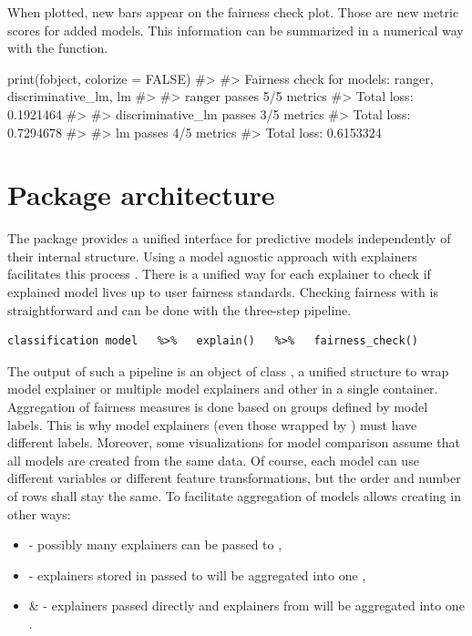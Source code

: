 When plotted, new bars appear on the fairness check plot. Those are new
metric scores for added models. This information can be summarized in a
numerical way with the  function.

\begin{example}
print(fobject, colorize = FALSE)
#> 
#> Fairness check for models: ranger, discriminative_lm, lm 
#> 
#> ranger passes 5/5 metrics
#> Total loss:  0.1921464 
#> 
#> discriminative_lm passes 3/5 metrics
#> Total loss:  0.7294678 
#> 
#> lm passes 4/5 metrics
#> Total loss:  0.6153324
\end{example}

\hypertarget{package-architecture}{%
\section{Package architecture}\label{package-architecture}}

The  package provides a unified interface for predictive
models independently of their internal structure. Using a model agnostic
approach with  explainers facilitates this process
\citep{JMLRv19}. There is a unified way for each explainer to check if
explained model lives up to user fairness standards. Checking fairness
with  is straightforward and can be done with the
three-step pipeline.

\begin{verbatim}
classification model   %>%   explain()   %>%   fairness_check() 
\end{verbatim}

The output of such a pipeline is an object of class
, a unified structure to wrap model explainer
or multiple model explainers and other  in a
single container. Aggregation of fairness measures is done based on
groups defined by model labels. This is why model explainers (even those
wrapped by ) must have different labels.
Moreover, some visualizations for model comparison assume that all
models are created from the same data. Of course, each model can use
different variables or different feature transformations, but the order
and number of rows shall stay the same. To facilitate aggregation of
models  allows creating  in
other ways:

\begin{itemize}
\tightlist
\item
   - possibly
  many explainers can be passed to ,
\item
   -
  explainers stored in  passed to
   will be aggregated into one
  ,
\item
   \&
   -
  explainers passed directly and explainers from
   will be aggregated into one
  .
\end{itemize}

